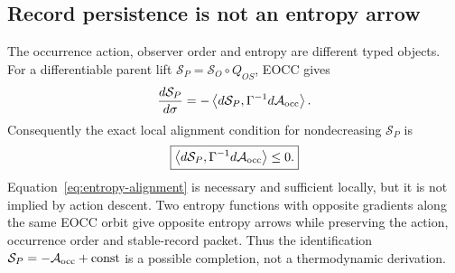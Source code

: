 \documentclass[11pt]{article}
\begin{document}
\subsection{Record persistence is not an entropy arrow}

The occurrence action, observer order and entropy are different typed
objects.  For a differentiable parent lift
\(\mathcal S_P=\mathcal S_O\circ Q_{OS}\), EOCC gives
\begin{equation}
 \frac{d\mathcal S_P}{d\sigma}
 =-\left\langle d\mathcal S_P,
 \Gamma^{-1}d\mathcal A_{\rm occ}\right\rangle.
 \label{eq:entropy-action-rate}
\end{equation}
Consequently the exact local alignment condition for nondecreasing
\(\mathcal S_P\) is
\begin{equation}
 \boxed{
 \left\langle d\mathcal S_P,
 \Gamma^{-1}d\mathcal A_{\rm occ}\right\rangle\le0.}
 \label{eq:entropy-alignment}
\end{equation}
Equation~\eqref{eq:entropy-alignment} is necessary and sufficient locally,
but it is not implied by action descent.  Two entropy functions with opposite
gradients along the same EOCC orbit give opposite entropy arrows while
preserving the action, occurrence order and stable-record packet.  Thus the
identification \(\mathcal S_P=-\mathcal A_{\rm occ}+\mathrm{const}\) is a
possible completion, not a thermodynamic derivation.
\end{document}
